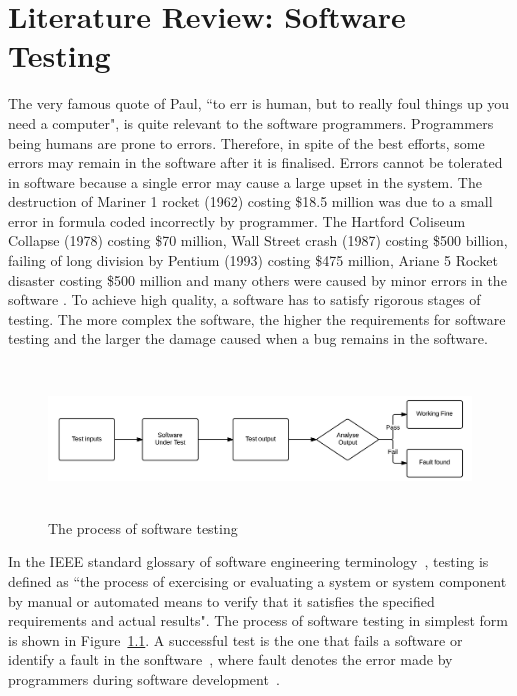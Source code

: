 \chapter{Literature Review: Software Testing}
\label{chap:softwareTesting}
The very famous quote of Paul, ``to err is human, but to really foul things up you need a computer", is quite relevant to the software programmers. Programmers being humans are prone to errors. Therefore, in spite of the best efforts, some errors may remain in the software after it is finalised.  Errors cannot be tolerated in software because a single error may cause a large upset in the system. The destruction of Mariner 1 rocket (1962) costing \$18.5 million was due to a small error in formula coded incorrectly by programmer. The Hartford Coliseum Collapse (1978) costing \$70 million, Wall Street crash (1987) costing \$500 billion, failing of long division by Pentium (1993) costing \$475 million, Ariane 5 Rocket disaster costing \$500 million and many others were caused by minor errors in the software \cite{toweysoftware}. To achieve high quality, a software has to satisfy rigorous stages of testing. The more complex the software, the higher the requirements for software testing and the larger the damage caused when a bug remains in the software.

\begin{figure}[h]
	\centering
	\includegraphics[width=15.5cm, height=4cm]{chapter2/softwareTesting.png}
	\caption{The process of software testing}
	\label{fig:softwareTesting}
\end{figure}

In the IEEE standard glossary of software engineering terminology~\cite{american1984}, testing is defined as ``the process of exercising or evaluating a system or system component by manual or automated means to verify that it satisfies the specified requirements and actual results". The process of software testing in simplest form is shown in Figure~\ref{fig:softwareTesting}. A successful test is the one that fails a software or identify a fault in the sonftware~\cite{Myers1979}, where fault denotes the error made by programmers during software development~\cite{american1984}.

